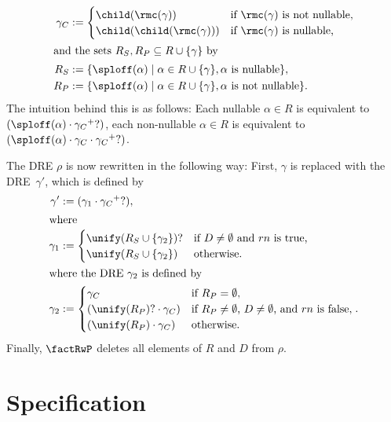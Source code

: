 \documentclass[a4paper,11pt, svgnames,titlepage]{article}
\newcommand{\rxp}{{^\mathtt{+}}}
\newcommand{\rxo}{\mathtt{?}}
\newcommand{\rxc}{\cdot}
\newcommand{\df}{:=}
\begin{document}
\begin{itemize}
\begin{align*}
	\gamma_{C}&\df \begin{cases}
		\child(\rmc(\gamma)) & \text{if $\rmc(\gamma)$ is not nullable,}\\ 
		\child(\child(\rmc(\gamma))) & \text{if $\rmc(\gamma)$ is nullable,} 
	\end{cases}\\
\intertext{and the sets $R_S, R_P\subseteq R\cup\{\gamma\}$ by}
	R_S&\df\{\sploff(\alpha)\mid\alpha\in R\cup\{\gamma\}, \alpha\text{ is nullable}\},\\
	R_P&\df\{\sploff(\alpha)\mid\alpha\in R\cup\{\gamma\}, \alpha\text{ is not nullable}\}.
\end{align*}
The intuition behind this is as follows: Each nullable $\alpha\in R$ is equivalent to $(\sploff(\alpha)\rxc \gamma_{C}\rxp\rxo)$, each non-nullable $\alpha\in R$ is equivalent to $(\sploff(\alpha)\rxc \gamma_{C}\rxc\gamma_{C}\rxp\rxo)$.

The DRE $\rho$ is now rewritten in the following way: First, $\gamma$ is replaced with the DRE~$\gamma'$, which is defined by
\begin{align*}
	\gamma'&\df (\gamma_1\rxc\gamma_{C}\rxp\rxo),\\
	\shortintertext{where}	
	\gamma_1&\df \begin{cases}
		\unify(R_S\cup\{\gamma_2\})\rxo &  \text{if $D\neq \emptyset$ and $rn$ is true,}\\
		\unify(R_S\cup\{\gamma_2\}) & \text{otherwise.}
	\end{cases}\\
	\shortintertext{where the DRE~$\gamma_2$ is defined by }
	\gamma_2&\df \begin{cases}
		\gamma_{C} & \text{if $R_P=\emptyset$},\\
		(\unify(R_{P})\rxo\rxc\gamma_{C})&\text{if $R_P\neq \emptyset$, $D\neq\emptyset$, and $rn$ is false},\\
		(\unify(R_{P})\rxc\gamma_{C})&\text{otherwise}.
	\end{cases}.
\end{align*}
Finally, $\factRwP$ deletes all elements of $R$ and $D$ from $\rho$.
\end{itemize}
\section{Specification}\label{sec:spec}
\end{document}
